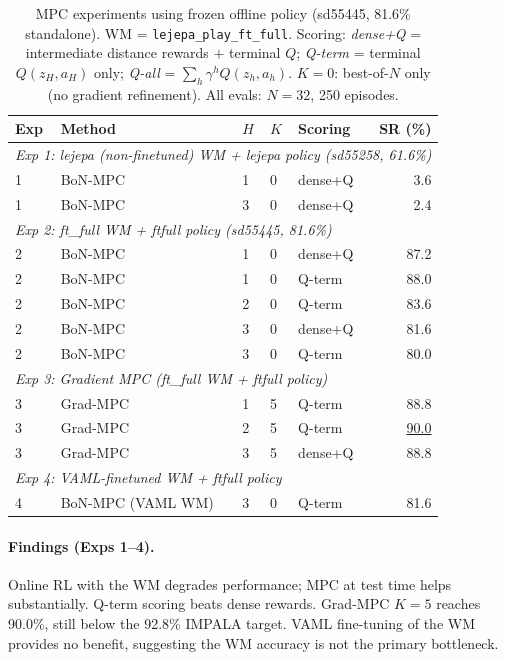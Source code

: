 \documentclass[11pt]{article}
\newcommand{\ours}[1]{\underline{#1}}
\begin{document}
\begin{table}[h]
\centering
\caption{MPC experiments using frozen offline policy (sd55445, 81.6\% standalone).
  WM = \texttt{lejepa\_play\_ft\_full}.
  Scoring: \emph{dense+Q} = intermediate distance rewards $+$ terminal $Q$;
  \emph{Q-term} = terminal $Q(z_H, a_H)$ only; \emph{Q-all} = $\sum_h \gamma^h Q(z_h, a_h)$.
  $K=0$: best-of-$N$ only (no gradient refinement).
  All evals: $N=32$, 250 episodes.}
\begin{tabular}{lllllr}
\toprule
Exp & Method & $H$ & $K$ & Scoring & SR (\%) \\
\midrule
\multicolumn{6}{l}{\textit{Exp 1: lejepa (non-finetuned) WM + lejepa policy (sd55258, 61.6\%)}} \\
1 & BoN-MPC            &  1 &  0 & dense+Q &  3.6 \\
1 & BoN-MPC            &  3 &  0 & dense+Q &  2.4 \\
\midrule
\multicolumn{6}{l}{\textit{Exp 2: ft\_full WM + ftfull policy (sd55445, 81.6\%)}} \\
2 & BoN-MPC            &  1 &  0 & dense+Q & 87.2 \\
2 & BoN-MPC            &  1 &  0 & Q-term  & 88.0 \\
2 & BoN-MPC            &  2 &  0 & Q-term  & 83.6 \\
2 & BoN-MPC            &  3 &  0 & dense+Q & 81.6 \\
2 & BoN-MPC            &  3 &  0 & Q-term  & 80.0 \\
\midrule
\multicolumn{6}{l}{\textit{Exp 3: Gradient MPC (ft\_full WM + ftfull policy)}} \\
3 & Grad-MPC           &  1 &  5 & Q-term  & 88.8 \\
3 & Grad-MPC           &  2 &  5 & Q-term  & \ours{90.0} \\
3 & Grad-MPC           &  3 &  5 & dense+Q & 88.8 \\
\midrule
\multicolumn{6}{l}{\textit{Exp 4: VAML-finetuned WM + ftfull policy}} \\
4 & BoN-MPC (VAML WM)  &  3 &  0 & Q-term  & 81.6 \\
\bottomrule
\end{tabular}
\end{table}

\paragraph{Findings (Exps 1--4).}
Online RL with the WM degrades performance; MPC at test time helps substantially.
Q-term scoring beats dense rewards. Grad-MPC $K=5$ reaches 90.0\%, still below
the 92.8\% IMPALA target. VAML fine-tuning of the WM provides no benefit,
suggesting the WM accuracy is not the primary bottleneck.
\end{document}
